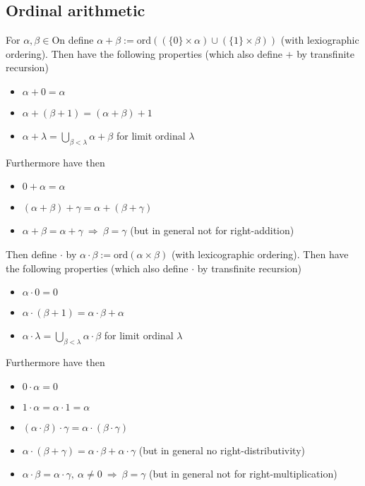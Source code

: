 \documentclass{scrartcl}
\begin{document}
\subsection{Ordinal arithmetic}
For $\alpha, \beta \in \mathrm{On}$ define $\alpha + \beta := \mathrm{ord}((\{0\} \times \alpha) \cup (\{1\} \times \beta))$ (with lexiographic ordering).
Then have the following properties (which also define $+$ by transfinite recursion)
\begin{itemize}
    \item $\alpha + 0 = \alpha$
    \item $\alpha + (\beta + 1) = (\alpha + \beta) + 1$
    \item $\alpha + \lambda = \bigcup_{\beta < \lambda} \alpha + \beta$ for limit ordinal $\lambda$
\end{itemize}
Furthermore have then
\begin{itemize}
    \item $0 + \alpha = \alpha$
    \item $(\alpha + \beta) + \gamma = \alpha + (\beta + \gamma)$
    \item $\alpha + \beta = \alpha + \gamma \ \Rightarrow \ \beta = \gamma$ (but in general not for right-addition)
\end{itemize}
Then define $\cdot$ by $\alpha \cdot \beta := \mathrm{ord}(\alpha \times \beta)$ (with lexicographic ordering).
Then have the following properties (which also define $\cdot$ by transfinite recursion)
\begin{itemize}
    \item $\alpha \cdot 0 = 0$
    \item $\alpha \cdot (\beta + 1) = \alpha \cdot \beta + \alpha$
    \item $\alpha \cdot \lambda = \bigcup_{\beta < \lambda} \alpha \cdot \beta$ for limit ordinal $\lambda$
\end{itemize}
Furthermore have then
\begin{itemize}
    \item $0 \cdot \alpha = 0$
    \item $1 \cdot \alpha = \alpha \cdot 1 = \alpha$
    \item $(\alpha \cdot \beta) \cdot \gamma = \alpha \cdot (\beta \cdot \gamma)$
    \item $\alpha \cdot (\beta + \gamma) = \alpha \cdot \beta + \alpha \cdot \gamma$ (but in general no right-distributivity)
    \item $\alpha \cdot \beta = \alpha \cdot \gamma, \ \alpha \neq 0 \ \Rightarrow \ \beta = \gamma$ (but in general not for right-multiplication)
\end{itemize}
\end{document}
